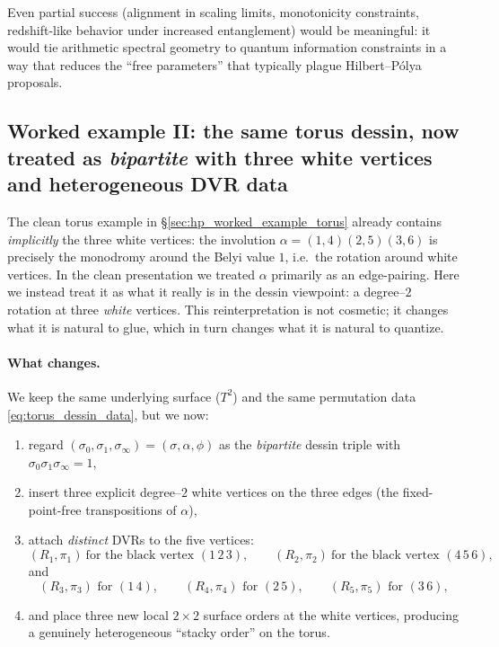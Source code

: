 \documentclass[11pt,oneside]{amsbook}
\numberwithin{equation}{section}
\theoremstyle{plain}
\theoremstyle{definition}
\theoremstyle{remark}
\begin{document}
Even partial success (alignment in scaling limits, monotonicity constraints, redshift-like behavior under increased entanglement) would be meaningful:
it would tie arithmetic spectral geometry to quantum information constraints in a way that reduces the ``free parameters'' that typically plague Hilbert--Pólya proposals.


\subsection{Worked example II: the same torus dessin, now treated as \emph{bipartite} with three white vertices and heterogeneous DVR data}
\label{sec:hp_worked_example_torus_bipartite}

The clean torus example in \S\ref{sec:hp_worked_example_torus} already contains \emph{implicitly} the three white vertices:
the involution $\alpha=(1,4)(2,5)(3,6)$ is precisely the monodromy around the Belyi value $1$, i.e.\ the rotation around white vertices.
In the clean presentation we treated $\alpha$ primarily as an edge-pairing.
Here we instead treat it as what it really is in the dessin viewpoint: a degree--$2$ rotation at three \emph{white} vertices.
This reinterpretation is not cosmetic; it changes what it is natural to glue, which in turn changes what it is natural to quantize.

\paragraph{What changes.}
We keep the same underlying surface ($T^2$) and the same permutation data \eqref{eq:torus_dessin_data}, but we now:
\begin{enumerate}[label=(\roman*)]
\item regard $(\sigma_0,\sigma_1,\sigma_\infty)=(\sigma,\alpha,\phi)$ as the \emph{bipartite} dessin triple with $\sigma_0\sigma_1\sigma_\infty=1$,
\item insert three explicit degree--$2$ white vertices on the three edges (the fixed-point-free transpositions of $\alpha$),
\item attach \emph{distinct} DVRs to the five vertices:
\[
(R_1,\pi_1)\ \text{for the black vertex }(1\,2\,3),\qquad
(R_2,\pi_2)\ \text{for the black vertex }(4\,5\,6),
\]
and
\[
(R_3,\pi_3)\text{ for }(1\,4),\qquad
(R_4,\pi_4)\text{ for }(2\,5),\qquad
(R_5,\pi_5)\text{ for }(3\,6),
\]
\item and place three new local \emph{$2\times 2$} surface orders at the white vertices, producing a genuinely heterogeneous ``stacky order'' on the torus.
\end{enumerate}
\end{document}
